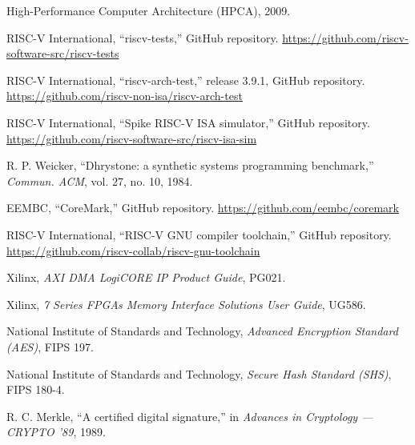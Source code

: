 \documentclass[11pt,a4paper]{article}
\begin{document}
\begin{enumerate}[label={[\arabic*]}, leftmargin=2.2em]
{High-Performance Computer Architecture (HPCA)}, 2009.
\item RISC-V International, ``riscv-tests,'' GitHub repository.
\url{https://github.com/riscv-software-src/riscv-tests}
\item RISC-V International, ``riscv-arch-test,'' release 3.9.1, GitHub
repository. \url{https://github.com/riscv-non-isa/riscv-arch-test}
\item RISC-V International, ``Spike RISC-V ISA simulator,'' GitHub
repository. \url{https://github.com/riscv-software-src/riscv-isa-sim}
\item R. P. Weicker, ``Dhrystone: a synthetic systems programming
benchmark,'' \emph{Commun. ACM}, vol. 27, no. 10, 1984.
\item EEMBC, ``CoreMark,'' GitHub repository.
\url{https://github.com/eembc/coremark}
\item RISC-V International, ``RISC-V GNU compiler toolchain,'' GitHub
repository. \url{https://github.com/riscv-collab/riscv-gnu-toolchain}
\item Xilinx, \emph{AXI DMA LogiCORE IP Product Guide}, PG021.
\item Xilinx, \emph{7 Series FPGAs Memory Interface Solutions User Guide},
UG586.
\item National Institute of Standards and Technology, \emph{Advanced
Encryption Standard (AES)}, FIPS 197.
\item National Institute of Standards and Technology, \emph{Secure Hash
Standard (SHS)}, FIPS 180-4.
\item R. C. Merkle, ``A certified digital signature,'' in \emph{Advances in
Cryptology --- CRYPTO '89}, 1989.
\end{enumerate}
\end{document}
